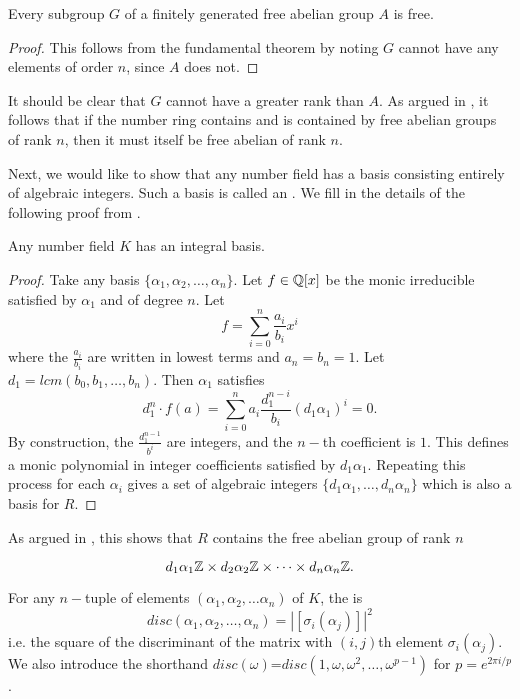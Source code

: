 \begin{corollary}
Every subgroup $G$ of a finitely generated free abelian group $A$ is free.
\end{corollary}
\begin{proof}
This follows from the fundamental theorem by noting $G$ cannot have any elements of order $n$, since $A$ does not.
\end{proof}

It should be clear that $G$ cannot have a greater rank than $A$. As argued in \cite{NumberFields}, it follows that if the number ring contains and is contained by free abelian groups of rank $n$, then it must itself be free abelian of rank $n.$

Next, we would like to show that any number field has a basis consisting entirely of algebraic integers. Such a basis is called an . We fill in the details of the following proof from \cite{NumberFields}.

\begin{proposition}
Any number field $K$ has an integral basis.
\end{proposition}
\begin{proof}
Take any basis $\{\alpha_1,\alpha_2,\dots,\alpha_n\}$. Let $f\in \mathbb{Q}[x]$ be the monic irreducible satisfied by $\alpha_1$ and of degree $n$. Let
$$f=\sum_{i=0}^{n}\frac{a_i}{b_i}x^i$$
where the $\frac{a_i}{b_i}$ are written in lowest terms and $a_n=b_n=1$. Let $d_1=lcm(b_0,b_1,\dots,b_n)$. Then $\alpha_1$ satisfies $$d_1^n\cdot f(a)=\sum_{i=0}^n a_i \frac{d_1^{n-i}}{b_i}(d_1\alpha_1)^i=0.$$
By construction, the $\frac{d_1^{n-1}}{b^i}$ are integers, and the $n-$th coefficient is $1$. This defines a monic polynomial in integer coefficients satisfied by $d_1\alpha_1$. Repeating this process for each $\alpha_i$ gives a set of algebraic integers $\{d_1\alpha_1,\dots,d_n\alpha_n\}$ which is also a basis for $R$.
\end{proof}

As argued in \cite{NumberFields}, this shows that $R$ contains the free abelian group of rank $n$

$$d_1\alpha_1\mathbb{Z}\times d_2\alpha_2\mathbb{Z}\times \dots \times d_n\alpha_n\mathbb{Z}.$$

\begin{definition}
For any $n-$tuple of elements $(\alpha_1,\alpha_2,\dots \alpha_n)$ of $K$, the  is 
$$disc(\alpha_1,\alpha_2,\dots,\alpha_n)=|[\sigma_i(\alpha_j)]|^2$$
i.e. the square of the discriminant of the matrix with $(i,j)$th element $\sigma_i(\alpha_j)$. We also introduce the shorthand $disc(\omega)$=$disc(1,\omega,\omega^2,\dots,\omega^{p-1})$ for $p=e^{2\pi i/p}$.
\end{definition}

